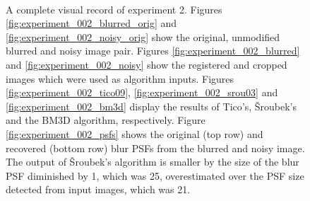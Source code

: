 \documentclass[12pt,notitlepage]{report}
\begin{document}
\begin{figure}[t]
	  ~
	  ~
  \caption[A complete visual record of experiment 2]{A complete visual record of experiment 2. Figures \ref{fig:experiment_002_blurred_orig} and \ref{fig:experiment_002_noisy_orig} show the original, unmodified blurred and noisy image pair. Figures \ref{fig:experiment_002_blurred} and \ref{fig:experiment_002_noisy} show the registered and cropped images which were used as algorithm inputs. Figures \ref{fig:experiment_002_tico09}, \ref{fig:experiment_002_srou03} and \ref{fig:experiment_002_bm3d} display the results of Tico's, Šroubek's and the BM3D algorithm, respectively. Figure \ref{fig:experiment_002_psfs} shows the original (top row) and recovered (bottom row) blur PSFs from the blurred and noisy image. The output of Šroubek's algorithm is smaller by the size of the blur PSF diminished by 1, which was 25, overestimated over the PSF size detected from input images, which was 21.}
  \label{fig:experiment_002_complete}
\end{figure}
\end{document}
